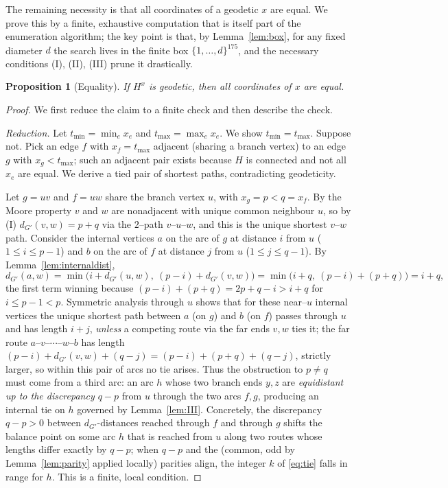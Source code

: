 \documentclass{amsart}
\theoremstyle{plain}
\newtheorem{proposition}{Proposition}
\theoremstyle{definition}
\newcommand{\dG}{d_{G'}}
\begin{document}
The remaining necessity is that all coordinates of a geodetic $x$ are equal. We
prove this by a finite, exhaustive computation that is itself part of the
enumeration algorithm; the key point is that, by Lemma~\ref{lem:box}, for any fixed
diameter $d$ the search lives in the finite box $\{1,\dots,d\}^{175}$, and the
necessary conditions (I), (II), (III) prune it drastically.

\begin{proposition}[Equality]\label{prop:equal}
If $H^x$ is geodetic, then all coordinates of $x$ are equal.
\end{proposition}

\begin{proof}
We first reduce the claim to a finite check and then describe the check.

\emph{Reduction.} Let $t_{\min}=\min_e x_e$ and $t_{\max}=\max_e x_e$. We show
$t_{\min}=t_{\max}$. Suppose not. Pick an edge $f$ with $x_f=t_{\max}$ adjacent
(sharing a branch vertex) to an edge $g$ with $x_g<t_{\max}$; such an adjacent pair
exists because $H$ is connected and not all $x_e$ are equal. We derive a tied pair
of shortest paths, contradicting geodeticity.

Let $g=uv$ and $f=uw$ share the branch vertex $u$, with $x_g=p<q=x_f$. By the Moore
property $v$ and $w$ are nonadjacent with unique common neighbour $u$, so by (I)
$\dG(v,w)=p+q$ via the $2$--path $v$--$u$--$w$, and this is the unique shortest
$v$--$w$ path. Consider the internal vertices $a$ on the arc of $g$ at distance $i$
from $u$ ($1\le i\le p-1$) and $b$ on the arc of $f$ at distance $j$ from $u$
($1\le j\le q-1$). By Lemma~\ref{lem:internaldist},
\[
\dG(a,w)=\min\bigl(i+\dG(u,w),\ (p-i)+\dG(v,w)\bigr)
       =\min\bigl(i+q,\ (p-i)+(p+q)\bigr)=i+q,
\]
the first term winning because $(p-i)+(p+q)=2p+q-i>i+q$ for $i\le p-1<p$. Symmetric
analysis through $u$ shows that for these near--$u$ internal vertices the unique
shortest path between $a$ (on $g$) and $b$ (on $f$) passes through $u$ and has length
$i+j$, \emph{unless} a competing route via the far ends $v,w$ ties it; the far route
$a$--$v$--$\cdots$--$w$--$b$ has length $(p-i)+\dG(v,w)+(q-j)=(p-i)+(p+q)+(q-j)$,
strictly larger, so within this pair of arcs no tie arises. Thus the obstruction to
$p\ne q$ must come from a third arc: an arc $h$ whose two branch ends $y,z$ are
\emph{equidistant up to the discrepancy $q-p$} from $u$ through the two arcs $f,g$,
producing an internal tie on $h$ governed by Lemma~\ref{lem:III}. Concretely, the
discrepancy $q-p>0$ between $\dG$-distances reached through $f$ and through $g$ shifts
the balance point on some arc $h$ that is reached from $u$ along two routes whose
lengths differ exactly by $q-p$; when $q-p$ and the (common, odd by
Lemma~\ref{lem:parity} applied locally) parities align, the integer $k$ of
\eqref{eq:tie} falls in range for $h$. This is a finite, local condition.


\end{proof}
\end{document}
